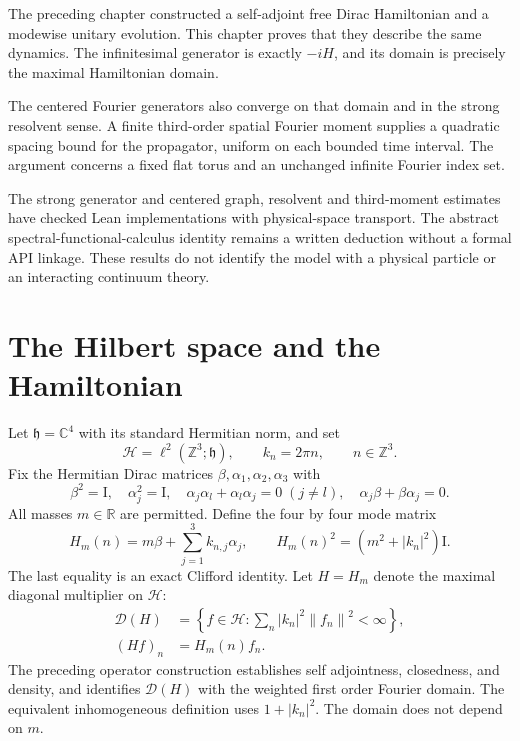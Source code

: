 \documentclass[11pt,oneside]{article}
\theoremstyle{kol}
\theoremstyle{definition}
\newcommand{\Hu}{\mathcal H}
\newcommand{\Dn}{\mathcal D}
\newcommand{\C}{\mathbb C}
\newcommand{\R}{\mathbb R}
\newcommand{\Z}{\mathbb Z}
\newcommand{\Id}{\mathrm I}
\newcommand{\pp}[1]{\left\lVert#1\right\rVert}
\begin{document}
The preceding chapter constructed a self-adjoint free Dirac Hamiltonian and a modewise unitary evolution. This chapter proves that they describe the same dynamics. The infinitesimal generator is exactly $-iH$, and its domain is precisely the maximal Hamiltonian domain.

The centered Fourier generators also converge on that domain and in the strong resolvent sense. A finite third-order spatial Fourier moment supplies a quadratic spacing bound for the propagator, uniform on each bounded time interval. The argument concerns a fixed flat torus and an unchanged infinite Fourier index set.

The strong generator and centered graph, resolvent and third-moment estimates have checked Lean implementations with physical-space transport. The abstract spectral-functional-calculus identity remains a written deduction without a formal API linkage. These results do not identify the model with a physical particle or an interacting continuum theory.

\section{The Hilbert space and the Hamiltonian}
Let $\mathfrak h=\C^4$ with its standard Hermitian norm, and set
\begin{equation}\label{eq:space}
\Hu=\ell^2(\Z^3;\mathfrak h),\qquad k_n=2\pi n, \qquad n\in\Z^3.
\end{equation}
Fix the Hermitian Dirac matrices $\beta,\alpha_1,\alpha_2,\alpha_3$ with
\begin{equation}\label{eq:clifford}
\beta^2=\Id,\quad \alpha_j^2=\Id,\quad
\alpha_j\alpha_l+\alpha_l\alpha_j=0\;(j\ne l),\quad
\alpha_j\beta+\beta\alpha_j=0.
\end{equation}
All masses $m\in\R$ are permitted. Define the four by four mode matrix
\begin{equation}\label{eq:mode}
H_m(n)=m\beta+\sum_{j=1}^3 k_{n,j}\alpha_j,
\qquad H_m(n)^2=(m^2+|k_n|^2)\Id.
\end{equation}
The last equality is an exact Clifford identity. Let $H=H_m$ denote the maximal diagonal multiplier on $\Hu$:
\begin{equation}\label{eq:domain}
\begin{aligned}
\Dn(H)&=\left\{f\in\Hu:\sum_n |k_n|^2\pp{f_n}^2<\infty\right\},\\
(Hf)_n&=H_m(n)f_n.
\end{aligned}
\end{equation}
The preceding operator construction establishes self adjointness, closedness, and density, and identifies $\Dn(H)$ with the weighted first order Fourier domain. The equivalent inhomogeneous definition uses $1+|k_n|^2$. The domain does not depend on $m$.
\end{document}
